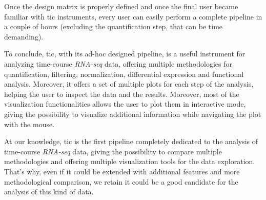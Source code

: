 Once the design matrix is properly defined and once the final user became familiar with \gls{tic} instruments, every user can easily perform a complete pipeline in a couple of hours (excluding the quantification step, that can be time demanding).

To conclude, \gls{tic}, with its ad-hoc designed pipeline, is a useful instrument for analyzing time-course \textit{RNA-seq} data, offering multiple methodologies for quantification, filtering, normalization, differential expression and functional analysis.
Moreover, it offers a set of multiple plots for each step of the analysis, helping the user to inspect the data and the results.
Moreover, most of the visualization functionalities allows the user to plot them in interactive mode, giving the possibility to visualize additional information while navigating the plot with the mouse.

At our knowledge, \gls{tic} is the first pipeline completely dedicated to the analysis of time-course \textit{RNA-seq} data, giving the possibility to compare multiple methodologies and offering multiple visualization tools for the data exploration.
That's why, even if it could be extended with additional features and more methodological comparison, we retain it could be a good candidate for the analysis of this kind of data.


